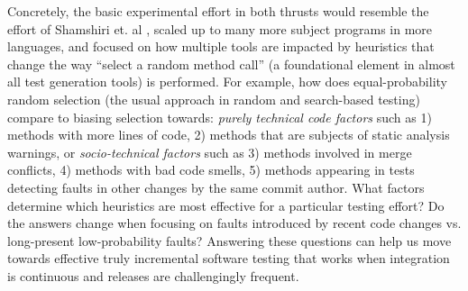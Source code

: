 \documentclass[10pt]{article}
\begin{document}
Concretely, the basic experimental effort in both thrusts would resemble the effort of Shamshiri et. al \cite{shamshiri2015automatically}, scaled up to many more subject programs in more languages, and  focused on how multiple tools are impacted by heuristics that change the way ``select a random method call'' (a foundational element in almost all test generation tools) is performed.  For example, how does equal-probability random selection (the usual approach in random and search-based testing) compare to biasing selection towards:  \emph{purely technical code factors} such as 1) methods with more lines of code, 2) methods that are subjects of static analysis warnings, or \emph{socio-technical factors} such as 3) methods involved in merge conflicts, 4) methods with bad code smells, 5) methods appearing in tests detecting faults in other changes by the same commit author.  What factors determine which heuristics are most effective for a particular testing effort?  Do the answers change when focusing on faults introduced by recent code changes vs. long-present low-probability faults?  Answering these questions can help us move towards effective truly incremental software testing that works when integration is continuous and releases are challengingly frequent. 




 


\end{document}
